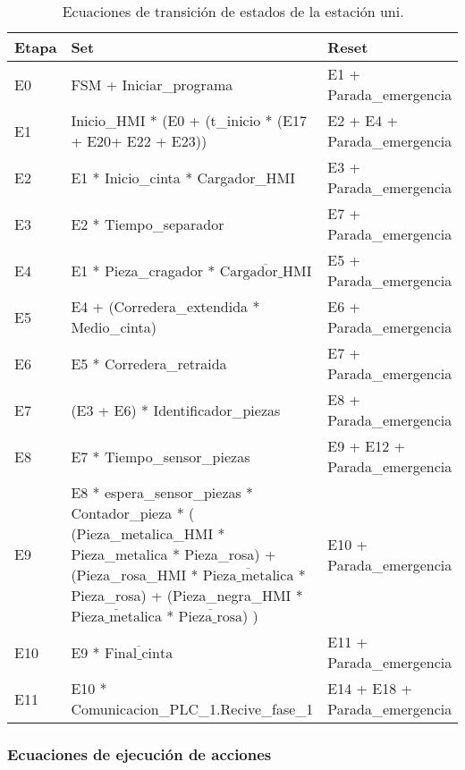 \begin{table}[H]
\begin{center}

\renewcommand{\arraystretch}{1.5}
\begin{tabular}{|M{1.5cm}|M{6cm}|M{6cm}|}
\hline
\textbf{Etapa} & 
\textbf{Set} & 
\textbf{Reset} \\
\hline
E0  &  FSM + Iniciar\_programa & E1 + Parada\_emergencia \\
\hline
E1  &  Inicio\_HMI * (E0 + (t\_inicio  * (E17 + E20+ E22 + E23)) & E2 + E4 + Parada\_emergencia  \\
\hline
E2  &  E1 * Inicio\_cinta * Cargador\_HMI & E3 + Parada\_emergencia \\
\hline
E3  &  E2 * Tiempo\_separador & E7 + Parada\_emergencia \\
\hline
E4  &  E1 * Pieza\_cragador * $\overline{\text{Cargador\_HMI}}$ & E5 + Parada\_emergencia \\
\hline
E5  &  E4 + (Corredera\_extendida * Medio\_cinta) & E6 + Parada\_emergencia \\
\hline
E6  &  E5 * Corredera\_retraida & E7 + Parada\_emergencia \\
\hline
E7  &  (E3 + E6) * Identificador\_piezas & E8 + Parada\_emergencia \\
\hline
E8  &  E7 * Tiempo\_sensor\_piezas & E9 + E12 + Parada\_emergencia \\
\hline
E9 & 
E8 * espera\_sensor\_piezas * Contador\_pieza * 
( (Pieza\_metalica\_HMI * Pieza\_metalica * Pieza\_rosa) + 
(Pieza\_rosa\_HMI * $\overline{\text{Pieza\_metalica}}$ * Pieza\_rosa) + 
(Pieza\_negra\_HMI * $\overline{\text{Pieza\_metalica}}$ * $\overline{\text{Pieza\_rosa}}$) )
 & E10 + Parada\_emergencia \\
\hline
E10  &  E9 * $\overline{\text{Final\_cinta}}$ & E11 + Parada\_emergencia \\
\hline
E11  &  E10 * Comunicacion\_PLC\_1.Recive\_fase\_1 & E14 + E18 + Parada\_emergencia \\
\hline

\end{tabular}

\caption{Ecuaciones de transición de estados de la estación uni.}
\label{cuadro:transiciones_union}
\end{center}
\end{table}

\subsubsection{Ecuaciones de ejecución de acciones}

